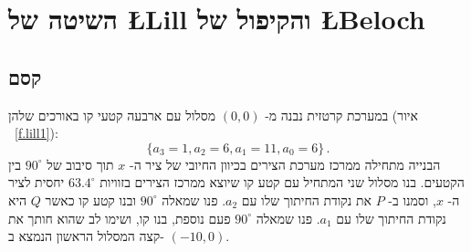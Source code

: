

\chapter[השיטה של
\L{\normalsize Lill}
והקיפול של
\L{\normalsize Beloch}]%
{השיטה של
\L{\Large Lill}
והקיפול של
\L{\Large Beloch}%
}\label{c.origami-cube}

\section{קסם}\label{s.magic}

במערכת קרטזית נבנה מ-%
$(0,0)$
מסלול עם ארבעה קטעי קו באורכים שלהן (איור%
~\ref{f.lill1}):
\[
\{a_3=1,a_2=6,a_1=11,a_0=6\}\,.
\]
הבנייה מתחילה ממרכז מערכת הצירים בכיוון החיובי של ציר ה-%
$x$
תוך סיבוב של
$90^\circ$
בין הקטעים. בנו מסלול שני המתחיל עם קטע קו שיוצא ממרכז הצירים בזוויות
$63.4^\circ$
יחסית לציר ה-%
$x$,
וסמנו ב-%
$P$ 
את נקודת החיתוך שלו עם
$a_2$.
פנו שמאלה 
$90^\circ$
ובנו קטע קו כאשר
$Q$
היא נקודת החיתוך שלו עם
$a_1$.
פנו שמאלה 
$90^\circ$
פעם נוספת, בנו קו, ושימו לב שהוא חותך את קצה המסלול הראשון הנמצא ב-%
$(-10,0)$.

